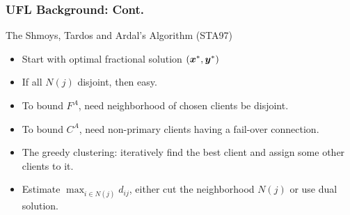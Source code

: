 \documentclass[handout, hyperref, xcolor=dvipsnames]{beamer}
\begin{document}
\begin{frame}
  \frametitle{UFL Background: Cont.}

  The Shmoys, Tardos and Ardal's Algorithm (STA97)
  \begin{itemize}
  \item Start with optimal fractional solution $(\boldsymbol{x}^\ast,\boldsymbol{y}^\ast)$
  \item If all $N(j)$ disjoint, then easy.
  \item To bound $F^A$, need neighborhood of chosen clients be disjoint.
  \item To bound $C^A$, need non-primary clients having a fail-over connection.
  \end{itemize}

  \begin{itemize}
  \item The greedy clustering: iteratively find the best client and assign some other clients to it.
  \item Estimate $\max_{i\in N(j)} d_{ij}$, either cut the neighborhood $N(j)$ or use dual solution.
  \end{itemize}
\end{frame}
\end{document}
